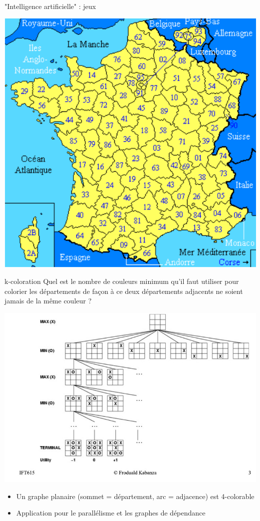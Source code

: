 \begin{frame}{"Intelligence artificielle" : jeux}
    \begin{center}
        \includegraphics[width=.9\textwidth]{fig/france.pdf}
    \end{center} 
\end{frame}

\begin{frame}{k-coloration}
Quel est le nombre de couleurs minimum qu'il faut utiliser pour colorier les départements de façon à ce deux départements adjacents ne soient jamais de la même couleur ?
\begin{center}
    \includegraphics[width=.5\textwidth]{fig/morpion.jpg}
\end{center} 
\begin{itemize}
    \item Un graphe planaire (sommet = département, arc = adjacence) est 4-colorable 
    \item Application pour le parallélisme et les graphes de dépendance 
\end{itemize}
\end{frame}